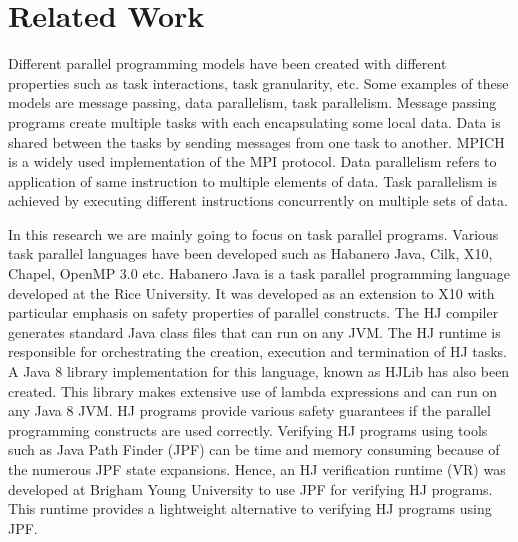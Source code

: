 \section{Related Work}

Different parallel programming models have been created with different properties such as task interactions, task granularity,  etc. Some examples of these models are message passing, data parallelism, task parallelism. Message passing \cite{Forum:1994:MMI:898758} programs create multiple tasks with each encapsulating some local data. Data is shared between the tasks by sending messages from one task to another. MPICH is a widely used implementation of the MPI protocol. Data parallelism refers to application of same instruction to multiple elements of data. Task parallelism is achieved by executing different instructions concurrently on multiple sets of data.

In this research we are mainly going to focus on task parallel programs. Various task parallel languages have been developed such as Habanero Java, Cilk, X10, Chapel, OpenMP 3.0 etc. Habanero Java \cite{cave2011habanero} is a task parallel programming language developed at the Rice University. It was developed as an extension to X10 with particular emphasis on safety properties of parallel constructs. The HJ compiler generates standard Java class files that can run on any JVM. The HJ runtime is responsible for orchestrating the creation, execution and termination of HJ tasks. A Java 8 library implementation for this language, known as HJLib \cite{imam2014habanero} has also been created. This library makes extensive use of lambda expressions and can run on any Java 8 JVM. HJ programs provide various safety guarantees if the parallel programming constructs are used correctly. Verifying HJ programs using tools such as Java Path Finder (JPF) can be time and memory consuming because of the numerous JPF state expansions. Hence, an HJ verification runtime (VR) \cite{anderson2014jpf} was developed at Brigham Young University to use JPF for verifying HJ programs. This runtime provides a lightweight alternative to verifying HJ programs using JPF.

